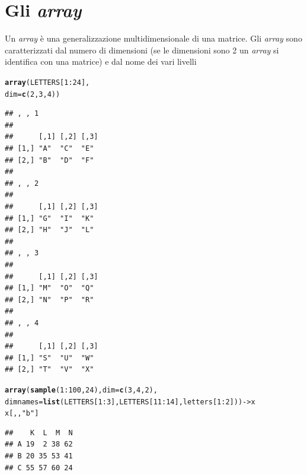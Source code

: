\documentclass[onecolumn,12pt]{book}\usepackage[]{graphicx}\usepackage[]{color}
\makeatletter
\newcommand{\hlnum}[1]{\textcolor[rgb]{0.686,0.059,0.569}{#1}}%
\newcommand{\hlstr}[1]{\textcolor[rgb]{0.192,0.494,0.8}{#1}}%
\newcommand{\hlopt}[1]{\textcolor[rgb]{0,0,0}{#1}}%
\newcommand{\hlstd}[1]{\textcolor[rgb]{0.345,0.345,0.345}{#1}}%
\newcommand{\hlkwb}[1]{\textcolor[rgb]{0.69,0.353,0.396}{#1}}%
\newcommand{\hlkwc}[1]{\textcolor[rgb]{0.333,0.667,0.333}{#1}}%
\newcommand{\hlkwd}[1]{\textcolor[rgb]{0.737,0.353,0.396}{\textbf{#1}}}%
\newenvironment{kframe}{%
 \def\at@end@of@kframe{}%
 \ifinner\ifhmode%
  \def\at@end@of@kframe{\end{minipage}}%
  \begin{minipage}{\columnwidth}%
 \fi\fi%
 \def\FrameCommand##1{\hskip\@totalleftmargin \hskip-\fboxsep
 \colorbox{shadecolor}{##1}\hskip-\fboxsep
     \hskip-\linewidth \hskip-\@totalleftmargin \hskip\columnwidth}%
 \MakeFramed {\advance\hsize-\width
   \@totalleftmargin\z@ \linewidth\hsize
   \@setminipage}}%
 {\par\unskip\endMakeFramed%
 \at@end@of@kframe}
\newenvironment{knitrout}{}{} %
\makeatother
\begin{document}
\section{Gli \emph{array}}
Un \emph{array}  \`e una generalizzazione multidimensionale di una matrice. Gli \emph{array} sono caratterizzati dal numero di dimensioni  (se le dimensioni sono 2 un \emph{array} si identifica con una  matrice) e dal nome dei vari livelli
\begin{knitrout}
\color{fgcolor}\begin{kframe}
\begin{alltt}
\hlkwd{array}\hlstd{(LETTERS[}\hlnum{1}\hlopt{:}\hlnum{24}\hlstd{],}
\hlkwc{dim}\hlstd{=}\hlkwd{c}\hlstd{(}\hlnum{2}\hlstd{,}\hlnum{3}\hlstd{,}\hlnum{4}\hlstd{))}
\end{alltt}
\begin{verbatim}
## , , 1
## 
##      [,1] [,2] [,3]
## [1,] "A"  "C"  "E" 
## [2,] "B"  "D"  "F" 
## 
## , , 2
## 
##      [,1] [,2] [,3]
## [1,] "G"  "I"  "K" 
## [2,] "H"  "J"  "L" 
## 
## , , 3
## 
##      [,1] [,2] [,3]
## [1,] "M"  "O"  "Q" 
## [2,] "N"  "P"  "R" 
## 
## , , 4
## 
##      [,1] [,2] [,3]
## [1,] "S"  "U"  "W" 
## [2,] "T"  "V"  "X"
\end{verbatim}
\begin{alltt}
\hlkwd{array}\hlstd{(}\hlkwd{sample}\hlstd{(}\hlnum{1}\hlopt{:}\hlnum{100}\hlstd{,}\hlnum{24}\hlstd{),} \hlkwc{dim}\hlstd{=}\hlkwd{c}\hlstd{(}\hlnum{3}\hlstd{,}\hlnum{4}\hlstd{,}\hlnum{2}\hlstd{),}
      \hlkwc{dimnames}\hlstd{=}\hlkwd{list}\hlstd{(LETTERS[}\hlnum{1}\hlopt{:}\hlnum{3}\hlstd{],LETTERS[}\hlnum{11}\hlopt{:}\hlnum{14}\hlstd{],letters[}\hlnum{1}\hlopt{:}\hlnum{2}\hlstd{]))}\hlkwb{->}\hlstd{x}
\hlstd{x[,,}\hlstr{"b"}\hlstd{]}
\end{alltt}
\begin{verbatim}
##    K  L  M  N
## A 19  2 38 62
## B 20 35 53 41
## C 55 57 60 24
\end{verbatim}
\end{kframe}
\end{knitrout}
\end{document}
